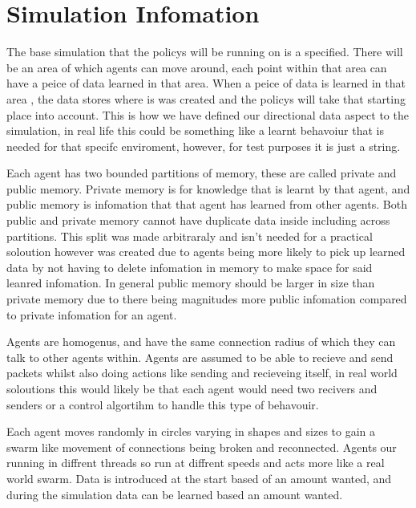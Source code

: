 \documentclass{UoYCSproject}
\begin{document}
\section{Simulation Infomation}
\label{sec:Sim Info}

The base simulation that the policys will be running on is a specified.
There will be an area of which agents can move around, each point within that area can have a peice of data learned in that area.
When a peice of data is learned in that area , the data stores where is was created and the policys will take that starting place into account.
This is how we have defined our directional data aspect to the simulation, in real life this could be something like a learnt behavoiur that is needed for that specifc enviroment, however, for test purposes it is just a string.

Each agent has two bounded partitions of memory, these are called private and public memory.
Private memory is for knowledge that is learnt by that agent, and public memory is infomation that that agent has learned from other agents.
Both public and private memory cannot have duplicate data inside including across partitions.
This split was made arbitraraly and isn't needed for a practical soloution however was created due to agents being more likely to pick up learned data by not having to delete infomation in memory to make space for said leanred infomation.
In general public memory should be larger in size than private memory due to there being magnitudes more public infomation compared to private infomation for an agent.

Agents are homogenus, and have the same connection radius of which they can talk to other agents within.
Agents are assumed to be able to recieve and send packets whilst also doing actions like sending and recieveing itself, in real world soloutions this would likely be that each agent would need two recivers and senders or a control algortihm to handle this type of behavouir.

Each agent moves randomly in circles varying in shapes and sizes to gain a swarm like movement of connections being broken and reconnected.
Agents our running in diffrent threads so run at diffrent speeds and acts more like a real world swarm.
Data is introduced at the start based of an amount wanted, and during the simulation data can be learned based an amount wanted.
\end{document}
